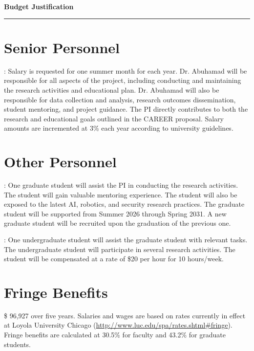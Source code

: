 \setcounter{section}{0}

{\Large\bfseries\filcenter
Budget Justification
\\\rule{\textwidth}{0.4pt}}


\section*{Senior Personnel}
: Salary is requested for one summer month for each year. Dr. Abuhamad will be responsible for all aspects of the project, including conducting and maintaining the research activities and educational plan. 
Dr. Abuhamad will also be responsible for data collection and analysis, research outcomes dissemination, student mentoring, and project guidance.
The PI directly contributes to both the research and educational goals outlined in the CAREER proposal.
Salary amounts are incremented at 3\% each year according to university guidelines.



\section*{Other Personnel}


: One graduate student will assist the PI in conducting the research activities.
The student will gain valuable mentoring experience. 
The student will also be exposed to the latest AI, robotics, and security research practices. 
The graduate student will be supported from Summer 2026 through Spring 2031. A new graduate student will be recruited upon the graduation of the previous one. 


: One undergraduate student will assist the graduate student with relevant tasks. 
The undergraduate student will participate in several research activities.
The student will be compensated at a rate of \$20 per hour for 10 hours/week.
\\




\section*{Fringe Benefits}
\$   96,927  over five years. Salaries and wages are based on rates currently in effect at Loyola University Chicago (\url{http://www.luc.edu/spa/rates.shtml#fringe}).  Fringe benefits are calculated at 30.5\% for faculty and 43.2\% for graduate students.

